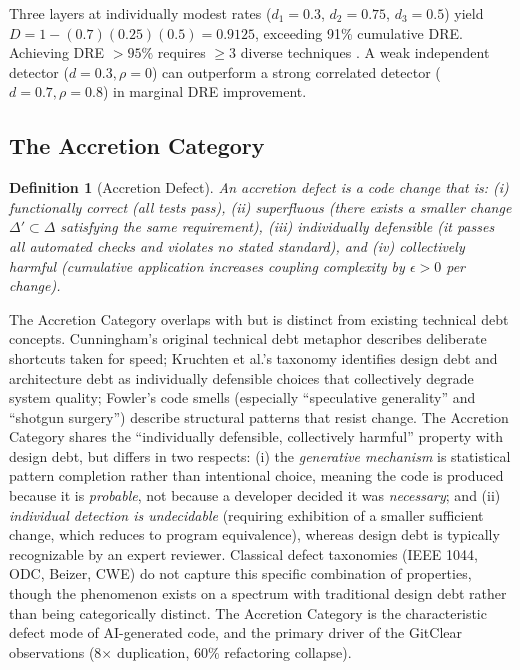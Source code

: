 \documentclass[11pt, a4paper]{googledeepmind}
\newtheorem{definition}{Definition}[section]
\begin{document}
Three layers at individually modest rates ($d_1 = 0.3$, $d_2 = 0.75$, $d_3 = 0.5$) yield $D = 1 - (0.7)(0.25)(0.5) = 0.9125$, exceeding 91\% cumulative DRE. Achieving DRE $> 95\%$ requires $\geq 3$ diverse techniques \citep{capersjones2012}. A weak independent detector ($d = 0.3, \rho = 0$) can outperform a strong correlated detector ($d = 0.7, \rho = 0.8$) in marginal DRE improvement.

\subsection{The Accretion Category}

\begin{definition}[Accretion Defect]
\label{def:accretion}
An \emph{accretion defect} is a code change that is: (i) functionally correct (all tests pass), (ii) superfluous (there exists a smaller change $\Delta' \subset \Delta$ satisfying the same requirement), (iii) individually defensible (it passes all automated checks and violates no stated standard), and (iv) collectively harmful (cumulative application increases coupling complexity by $\epsilon > 0$ per change).
\end{definition}

The Accretion Category overlaps with but is distinct from existing technical debt concepts. Cunningham's original technical debt metaphor \citep{cunningham1992} describes deliberate shortcuts taken for speed; Kruchten et al.'s taxonomy \citep{kruchten2012} identifies design debt and architecture debt as individually defensible choices that collectively degrade system quality; Fowler's code smells (especially ``speculative generality'' and ``shotgun surgery'') describe structural patterns that resist change. The Accretion Category shares the ``individually defensible, collectively harmful'' property with design debt, but differs in two respects: (i) the \emph{generative mechanism} is statistical pattern completion rather than intentional choice, meaning the code is produced because it is \emph{probable}, not because a developer decided it was \emph{necessary}; and (ii) \emph{individual detection is undecidable} (requiring exhibition of a smaller sufficient change, which reduces to program equivalence), whereas design debt is typically recognizable by an expert reviewer. Classical defect taxonomies (IEEE 1044, ODC, Beizer, CWE) do not capture this specific combination of properties, though the phenomenon exists on a spectrum with traditional design debt rather than being categorically distinct. The Accretion Category is the characteristic defect mode of AI-generated code, and the primary driver of the GitClear observations (8$\times$ duplication, 60\% refactoring collapse).
\end{document}
